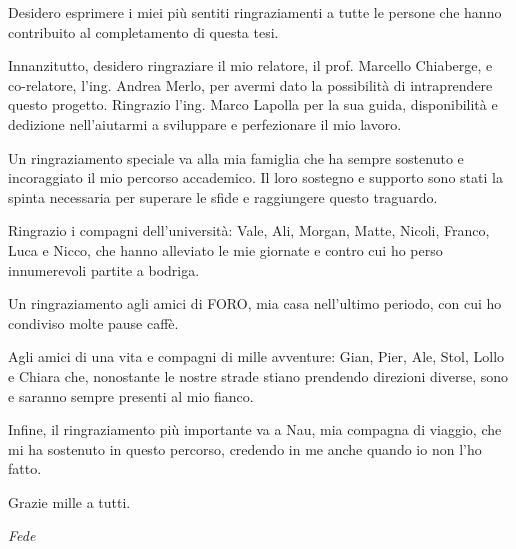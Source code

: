 
\begin{acknowledgements}
\addchaptertocentry{\acknowledgementname}
Desidero esprimere i miei più sentiti ringraziamenti a tutte le persone che hanno contribuito al completamento di questa tesi.

Innanzitutto, desidero ringraziare il mio relatore, il prof. Marcello Chiaberge, e co-relatore, l'ing. Andrea Merlo, per avermi dato la possibilità di intraprendere questo progetto. Ringrazio l'ing. Marco Lapolla per la sua guida, disponibilità e dedizione nell'aiutarmi a sviluppare e perfezionare il mio lavoro.

Un ringraziamento speciale va alla mia famiglia che ha sempre sostenuto e incoraggiato il mio percorso accademico. Il loro sostegno e supporto sono stati la spinta necessaria per superare le sfide e raggiungere questo traguardo.

Ringrazio i compagni dell'università: Vale, Ali, Morgan, Matte, Nicoli, Franco, Luca e Nicco, che hanno alleviato le mie giornate e contro cui ho perso innumerevoli partite a bodriga.

Un ringraziamento agli amici di FORO, mia casa nell'ultimo periodo, con cui ho condiviso molte pause caffè.

Agli amici di una vita e compagni di mille avventure: Gian, Pier, Ale, Stol, Lollo e Chiara che, nonostante le nostre strade stiano prendendo direzioni diverse, sono e saranno sempre presenti al mio fianco. 

Infine, il ringraziamento più importante va a Nau, mia compagna di viaggio, che mi ha sostenuto in questo percorso, credendo in me anche quando io non l'ho fatto.

Grazie mille a tutti.

\textit{Fede}

\end{acknowledgements}